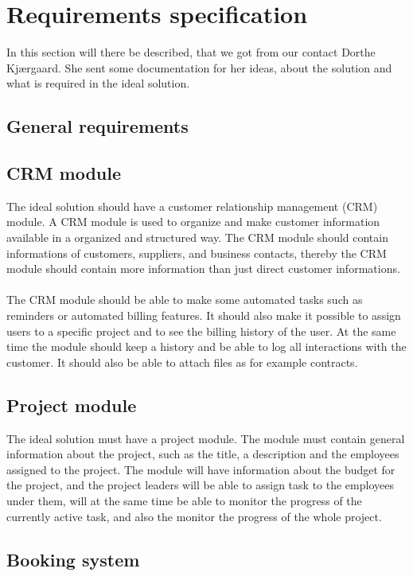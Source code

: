\section{Requirements specification}
In this section will there be described, that we got from our contact Dorthe Kjærgaard. She sent some documentation for her ideas, about the solution and what is required in the ideal solution. 

\subsection{General requirements}

\subsection{CRM module}

The ideal solution should have a customer relationship management (CRM) module. A CRM module is used to organize and make customer information available in a organized and structured way. The CRM module should contain informations of customers, suppliers, and business contacts, thereby the CRM module should contain more information than just direct customer informations.\\
\\
The CRM module should be able to make some automated tasks such as reminders or automated billing features. It should also make it possible to assign users to a specific project and to see the billing history of the user. At the same time the module should keep a history and be able to log all interactions with the customer. It should also be able to attach files as for example contracts.

\subsection{Project module}
The ideal solution must have a project module. The module must contain general information about the project, such as the title, a description and the employees assigned to the project. The module will have information about the budget for the project, and the project leaders will be able to assign task to the employees under them, will at the same time be able to monitor the progress of the currently active task, and also the monitor the progress of the whole project.

\subsection{Booking system}

